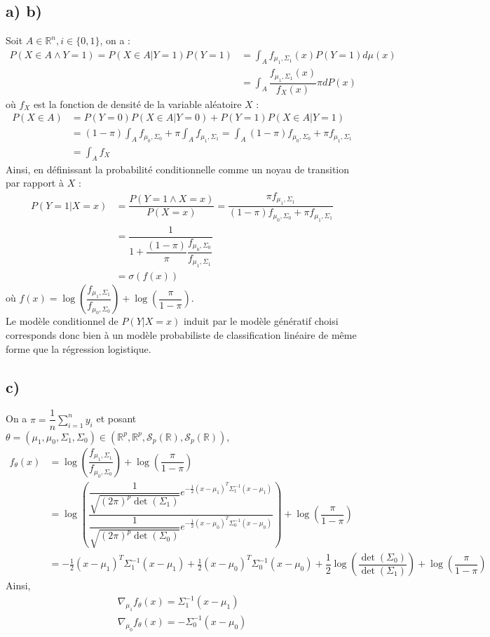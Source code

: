 \documentclass[paper=a4, fontsize=11pt]{article}
\begin{document}
\subsection{a) b)}
Soit $A \in \mathbb{R}^n, i \in \lbrace 0,1 \rbrace$, on a : 
\begin{align*}
P(X \in A \wedge Y = 1) = P(X \in A | Y = 1)P(Y=1) &= \int_{A} f_{\mu_1,\Sigma_1}(x)P(Y=1)d\mu(x) \\
&= \int_{A} \dfrac{f_{\mu_1,\Sigma_1}(x)}{f_{X}(x)}\pi dP(x)
\end{align*}
où $f_X$ est la fonction de densité de la variable aléatoire $X$ :
\begin{align*}
P(X \in A)&=P(Y =0)P(X \in A | Y =0)+P(Y =1)P(X \in A|Y =1) \\
&= (1-\pi)\int_{A} f_{\mu_0,\Sigma_0} + \pi\int_{A} f_{\mu_1,\Sigma_1} 
=  \int_{A} (1-\pi)f_{\mu_0,\Sigma_0} + \pi f_{\mu_1,\Sigma_1}  \\
&= \int_{A} f_{X}
\end{align*}
Ainsi, en définissant la probabilité conditionnelle comme un noyau de transition par rapport à $X$ :
\begin{align*}
P(Y=1|X=x) &= \dfrac{P(Y=1 \wedge X=x)}{P(X=x)} = \dfrac{\pi  f_{\mu_1,\Sigma_1} }{(1-\pi)f_{\mu_0,\Sigma_0} + \pi f_{\mu_1,\Sigma_1} }\\
&= \dfrac{1}{1+\dfrac{(1-\pi)}{\pi}\dfrac{f_{\mu_0,\Sigma_0}}{f_{\mu_1,\Sigma_1}}} \\
&= \sigma(f(x)) 
\end{align*}
où $f(x) = \log(\dfrac{f_{\mu_1,\Sigma_1}}{f_{\mu_0,\Sigma_0}}) + \log(\dfrac{\pi}{1-\pi})$.\\
Le modèle conditionnel de $P(Y|X=x)$ induit par le modèle génératif choisi corresponds donc bien à un modèle probabiliste de classification linéaire de même forme que la régression logistique. 

\subsection*{c)}
On a $\pi = \dfrac{1}{n}\sum\limits_{i=1}^{n} y_i$ et posant $\theta = (\mu_1,\mu_0,\Sigma_1,\Sigma_0) \in (\mathbb{R}^{p},\mathbb{R}^{p},\mathcal{S}_{p}(\mathbb{R}),\mathcal{S}_{p}(\mathbb{R}))$, 
\begin{align*}
f_{\theta}(x) &= \log(\dfrac{f_{\mu_1,\Sigma_1}}{f_{\mu_0,\Sigma_0}}) + \log(\dfrac{\pi}{1-\pi}) \\
&= \log(\dfrac{\dfrac{1}{\sqrt{(2\pi)^{p}\det(\Sigma_1)}}e^{-\frac{1}{2}(x-\mu_1)^{T}\Sigma_{1}^{-1}(x-\mu_1)}}
					{\dfrac{1}{\sqrt{(2\pi)^{p}\det(\Sigma_0)}}e^{-\frac{1}{2}(x-\mu_0)^{T}\Sigma_{0}^{-1}(x-\mu_0)}}) + \log(\dfrac{\pi}{1-\pi}) \\
&= -\frac{1}{2}(x-\mu_1)^{T}\Sigma_{1}^{-1}(x-\mu_1) +  \frac{1}{2}(x-\mu_0)^{T}\Sigma_{0}^{-1}(x-\mu_0) + \dfrac{1}{2}\log(\dfrac{\det(\Sigma_0)}{\det(\Sigma_1)}) + \log(\dfrac{\pi}{1-\pi})
\end{align*}
Ainsi, 
\begin{align*}
\nabla_{\mu_1}f_{\theta}(x) = \Sigma_{1}^{-1}(x-\mu_{1}) \\
\nabla_{\mu_0}f_{\theta}(x) = -\Sigma_{0}^{-1}(x-\mu_{0}) 
\end{align*}
\end{document}
